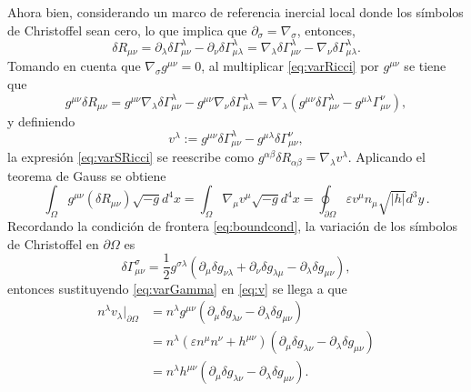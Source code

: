 Ahora bien, considerando un marco de referencia inercial local donde los símbolos de Christoffel sean cero, lo que implica que $\partial_{\sigma} = \nabla_{\sigma}$, entonces,
%
\begin{equation}
\label{eq:varRicci}
\delta R_{\mu \nu} = \partial_{\lambda} \delta \Gamma^{\lambda}_{\mu \nu} - \partial_{\nu} \delta \Gamma^{\lambda}_{\mu \lambda} = \nabla_{\lambda} \delta \Gamma^{\lambda}_{\mu \nu} - \nabla_{\nu} \delta \Gamma^{\lambda}_{\mu \lambda}.
\end{equation}
%
Tomando en cuenta que $\nabla_{\sigma} g^{\mu \nu} = 0$, al multiplicar \eqref{eq:varRicci} por $g^{\mu \nu}$ se tiene que
%
\begin{equation}
\label{eq:varSRicci}
g^{\mu \nu} \delta R_{\mu \nu} = g^{\mu \nu} \nabla_{\lambda} \delta \Gamma^{\lambda}_{\mu \nu} - g^{\mu \nu}\nabla_{\nu} \delta \Gamma^{\lambda}_{\mu \lambda}  = \nabla_{\lambda}(g^{\mu \nu} \delta \Gamma^{\lambda}_{\mu \nu} - g^{\mu \lambda} \Gamma^{\nu}_{\mu \nu}),
\end{equation}
%
y definiendo
%
\begin{equation}
\label{eq:v}
v^{\lambda} := g^{\mu \nu} \delta \Gamma^{\lambda}_{\mu \nu} - g^{\mu \lambda} \delta \Gamma^{\nu}_{\mu \nu},
\end{equation}
la expresión \eqref{eq:varSRicci} se reescribe como $g^{\alpha \beta} \delta R_{\alpha \beta} = \nabla_{\lambda} v^{\lambda}$. Aplicando el teorema de Gauss se obtiene
%
\begin{equation}
\label{eq:intDv}
\int_{\Omega} g^{\mu \nu} \left(  \delta R_{\mu \nu} \right) \sqrt{-g} d^4 x = \int_{\Omega} \nabla_{\mu} v^{\mu} \sqrt{-g} d^4 x = \oint_{\partial \Omega} \varepsilon v^{\mu} n_{\mu} \sqrt{|h|} d^3 y \, .
\end{equation}
%
Recordando la condición de frontera \eqref{eq:boundcond}, la variación de los símbolos de Christoffel en $\partial \Omega$ es
%
\begin{equation}
\label{eq:varGamma}
\delta \Gamma^{\sigma}_{\mu \nu} = \frac{1}{2} g^{\sigma \lambda} (\partial_{\mu} \delta g_{\nu \lambda} + \partial_{\nu} \delta g_{\lambda \mu} - \partial_{\lambda} \delta g_{\mu \nu}),
\end{equation}
%
entonces sustituyendo \eqref{eq:varGamma} en \eqref{eq:v} se llega a que
%
\begin{align}
\label{eq:vn}
n^{\lambda} v_{\lambda} \Big|_{\partial \Omega} & = n^{\lambda} g^{\mu \nu} (\partial_{\mu} \delta g_{\lambda \nu} - \partial_{\lambda} \delta g_{\mu \nu}) \nonumber \\
& = n^{\lambda} (\varepsilon n^{\mu} n^{\nu} + h^{\mu \nu}) (\partial_{\mu} \delta g_{\lambda \nu} - \partial_{\lambda} \delta g_{\mu \nu}) \nonumber \\
& = n^{\lambda} h^{\mu \nu} (\partial_{\mu} \delta g_{\lambda \nu} - \partial_{\lambda} \delta g_{\mu \nu}).
\end{align}
